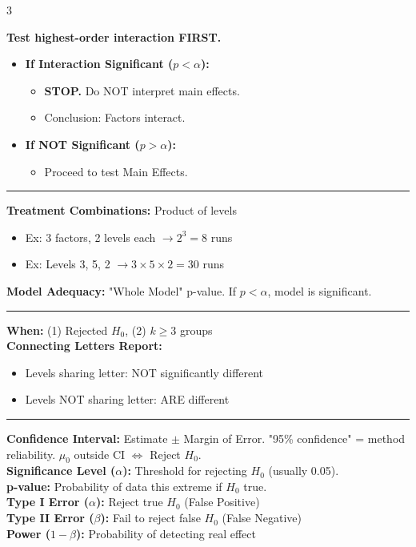 \documentclass[7pt, letterpaper]{article}
\newcommand{\sectionhead}[1]{%
    \vspace{0.5mm}{\normalsize\bfseries#1}\vspace{0mm}\hrule\vspace{0.5mm}%
}
\begin{document}
\begin{multicols}{3}
\begin{tcolorbox}[colback=yellow!10, colframe=black, boxrule=0.5pt, title=\textbf{Analysis Hierarchy (Stop Rule)}]
\textbf{Test highest-order interaction FIRST.}
\begin{itemize}
    \item \textbf{If Interaction Significant ($p < \alpha$):}
    \begin{itemize}
        \item \textbf{STOP.} Do NOT interpret main effects.
        \item Conclusion: Factors interact.
    \end{itemize}
    \item \textbf{If NOT Significant ($p > \alpha$):}
    \begin{itemize}
        \item Proceed to test Main Effects.
    \end{itemize}
\end{itemize}
\end{tcolorbox}

\sectionhead{Factorial Experiments}
\textbf{Treatment Combinations:} Product of levels
\begin{itemize}
    \item Ex: 3 factors, 2 levels each $\to 2^3 = 8$ runs
    \item Ex: Levels 3, 5, 2 $\to 3 \times 5 \times 2 = 30$ runs
\end{itemize}
\textbf{Model Adequacy:} "Whole Model" p-value. If $p < \alpha$, model is significant.

\sectionhead{Post-Hoc: Tukey's HSD}
\textbf{When:} (1) Rejected $H_0$, (2) $k \ge 3$ groups \\
\textbf{Connecting Letters Report:}
\begin{itemize}
    \item Levels sharing letter: NOT significantly different
    \item Levels NOT sharing letter: ARE different
\end{itemize}

\sectionhead{Inference Recap}
\textbf{Confidence Interval:} Estimate $\pm$ Margin of Error. "95\% confidence" = method reliability. $\mu_0$ outside CI $\iff$ Reject $H_0$. \\
\textbf{Significance Level ($\alpha$):} Threshold for rejecting $H_0$ (usually 0.05). \\
\textbf{p-value:} Probability of data this extreme if $H_0$ true. \\
\textbf{Type I Error ($\alpha$):} Reject true $H_0$ (False Positive) \\
\textbf{Type II Error ($\beta$):} Fail to reject false $H_0$ (False Negative) \\
\textbf{Power ($1-\beta$):} Probability of detecting real effect


\end{multicols}
\end{document}
